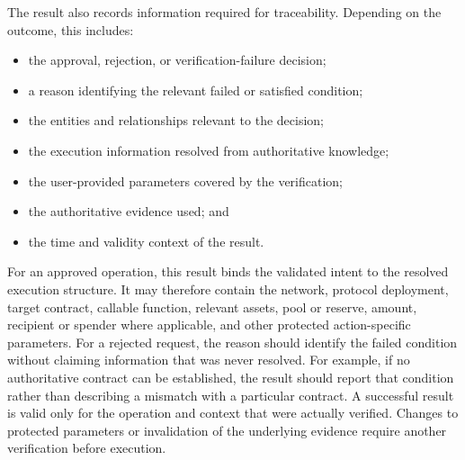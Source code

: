 The result also records information required for traceability. Depending on the
outcome, this includes:

\begin{itemize}
    \item the approval, rejection, or verification-failure decision;
    \item a reason identifying the relevant failed or satisfied condition;
    \item the entities and relationships relevant to the decision;
    \item the execution information resolved from authoritative knowledge;
    \item the user-provided parameters covered by the verification;
    \item the authoritative evidence used; and
    \item the time and validity context of the result.
\end{itemize}

For an approved operation, this result binds the validated intent to the
resolved execution structure. It may therefore contain the network, protocol
deployment, target contract, callable function, relevant assets, pool or
reserve, amount, recipient or spender where applicable, and other protected
action-specific parameters. For a rejected request, the reason should identify the failed condition without
claiming information that was never resolved. For example, if no authoritative
contract can be established, the result should report that condition rather
than describing a mismatch with a particular contract. A successful result is valid only for the operation and context that were
actually verified. Changes to protected parameters or invalidation of the
underlying evidence require another verification before execution.

